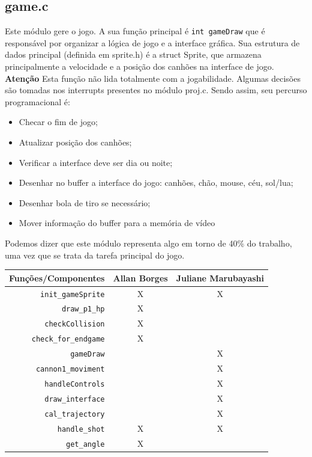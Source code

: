 \documentclass[12pt]{article}
\begin{document}
\subsection{game.c}
Este módulo gere o jogo. \newline
A sua função principal é \texttt{int gameDraw} que é responsável por organizar a lógica de jogo e a interface gráfica.
\newline
Sua estrutura de dados principal (definida em sprite.h) é a struct Sprite, que armazena principalmente a velocidade e a posição dos canhões na
interface de jogo. \newline 
\textbf{{\color{red} Atenção}} Esta função não lida totalmente com a jogabilidade. Algumas decisões são tomadas nos interrupts
presentes no módulo proj.c.\newline
Sendo assim, seu percurso programacional é: 
\begin{itemize}
    \item Checar o fim de jogo;
    \item Atualizar posição dos canhões;
    \item Verificar a interface deve ser dia ou noite;
    \item Desenhar no buffer a interface do jogo: canhões, chão, mouse, céu, sol/lua;
    \item Desenhar bola de tiro se necessário;
    \item Mover informação do buffer para a memória de vídeo
\end{itemize}
Podemos dizer que este módulo representa algo em torno de 40\% do trabalho, uma vez que se trata 
da tarefa principal do jogo. 
\begin{center}
    \begin{tabular}{|r|c|c|}
        \hline
        \textbf{Funções/Componentes} & \textbf{Allan Borges} & \textbf{Juliane Marubayashi} \\ 
        \hline
        \texttt{init\_gameSprite} & X & X \\ 
        \texttt{draw\_p1\_hp} & X & \\ 
        \texttt{checkCollision} & X & \\ 
        \texttt{check\_for\_endgame} & X & \\  
        \texttt{gameDraw} & & X \\ 
        \texttt{cannon1\_moviment} & & X \\ 
        \texttt{handleControls} & & X \\ 
        \texttt{draw\_interface} & & X \\ 
        \texttt{cal\_trajectory} & & X \\ 
        \texttt{handle\_shot} & X & X \\ 
        \texttt{get\_angle} & X & \\ 
        \hline
    \end{tabular}
\end{center}
\end{document}
